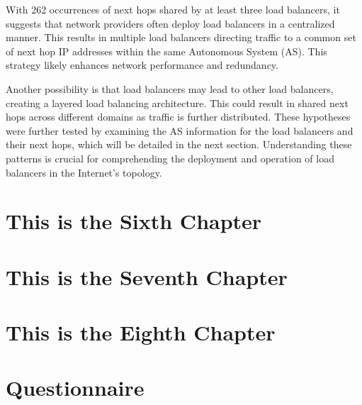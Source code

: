 \documentclass[12pt]{cwru_thesis}
\begin{document}
With 262 occurrences of next hops shared by at least three load balancers, it suggests that network providers often deploy load balancers in a centralized manner. This results in multiple load balancers directing traffic to a common set of next hop IP addresses within the same Autonomous System (AS). This strategy likely enhances network performance and redundancy.

Another possibility is that load balancers may lead to other load balancers, creating a layered load balancing architecture. This could result in shared next hops across different domains as traffic is further distributed. These hypotheses were further tested by examining the AS information for the load balancers and their next hops, which will be detailed in the next section. Understanding these patterns is crucial for comprehending the deployment and operation of load balancers in the Internet's topology.



\chapter{This is the Sixth Chapter}
\chapter{This is the Seventh Chapter}
\chapter{This is the Eighth Chapter}


\appendix

\chapter{Questionnaire}

\printbibliography[heading=bibintoc]
\end{document}
